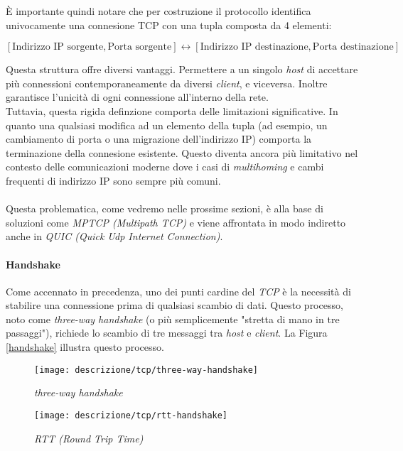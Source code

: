 \noindent È importante quindi notare che per costruzione il protocollo identifica univocamente una connesione TCP con una tupla composta da 4 elementi:

\begin{center}
    \small
    $[\text{Indirizzo IP sorgente}, \text{Porta sorgente}] \leftrightarrow [\text{Indirizzo IP destinazione}, \text{Porta destinazione}]$
\end{center}

\noindent Questa struttura offre diversi vantaggi. Permettere a un singolo \emph{host} di accettare più connessioni contemporaneamente da diversi \emph{client}, e viceversa. 
Inoltre garantisce l'unicità di ogni connessione all'interno della rete.
\\
Tuttavia, questa rigida definzione comporta delle limitazioni significative. In quanto una qualsiasi modifica ad un elemento della tupla (ad esempio, un cambiamento di porta o una migrazione dell'indirizzo IP) comporta la terminazione della connesione esistente. Questo diventa ancora più limitativo nel contesto delle comunicazioni moderne dove i casi di \emph{multihoming \glsfirstoccur} e cambi frequenti di indirizzo IP sono sempre più comuni.
\\
\\
Questa problematica, come vedremo nelle prossime sezioni, è alla base di soluzioni come \emph{MPTCP (Multipath TCP)} e viene affrontata in modo indiretto anche in \emph{QUIC (Quick Udp Internet Connection)}.

\paragraph{ Handshake }

\noindent Come accennato in precedenza, uno dei punti cardine del \emph{TCP} è la necessità di stabilire una connessione prima di qualsiasi scambio di dati. Questo processo, noto come \emph{three-way handshake} (o più semplicemente "stretta di mano in tre passaggi"), richiede lo scambio di tre messaggi tra \emph{host} e \emph{client}. La Figura \ref{handshake} illustra questo processo.

\begin{figure}[!h]
    \centering
    \begin{minipage}{0.48\textwidth}
        \centering
        \texttt{[image: descrizione/tcp/three-way-handshake]}
        \caption{\emph{three-way handshake}}
        \label{handshake}
    \end{minipage}
    \hfill
    \begin{minipage}{0.48\textwidth}
        \centering
        \texttt{[image: descrizione/tcp/rtt-handshake]}
        \caption{\emph{RTT (Round Trip Time)}}
        \label{rtt}
    \end{minipage}
\end{figure}

